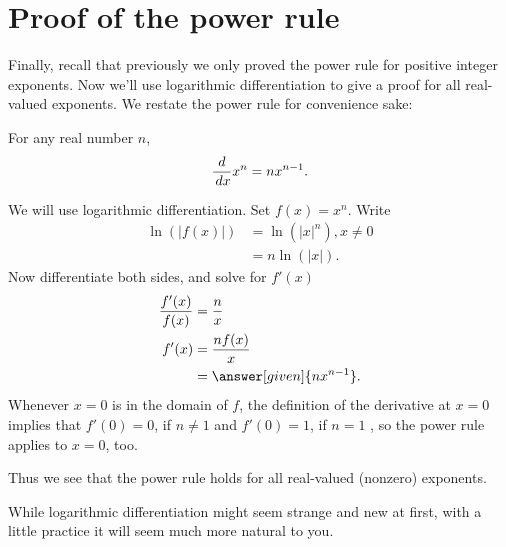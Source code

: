 \documentclass{ximera}
\begin{document}
\section{Proof of the power rule}


Finally, recall that previously we only proved the power rule for
positive integer exponents. Now we'll use logarithmic differentiation to give
a proof for all real-valued exponents. We restate the power rule
for convenience sake:

\begin{theorem}
	For any  real number $n$, 
	\[ \frac{d}{\,d x} x^n = n x^{n-1}. \]
	\begin{explanation}
	
		We will use logarithmic differentiation. Set $f(x) = x^n$. Write
		\begin{align*}
			\ln(|f(x)|) &= \ln\left(|x|^n\right) , x\ne0\\ 
				&= n\ln(|x|).
		\end{align*}
		Now differentiate both sides, and solve for $f'(x)$
		\begin{align*}
			\frac{f'(x)}{f(x)} &= \frac{n}{x}\\
				f'(x) &=\frac{n f(x)}{x}\\
				&= \answer[given]{n x^{n-1}}.
		\end{align*}
		Whenever $x=0$ is in the domain of $f$, the definition of the derivative at $x=0$ implies that  $f'(0)=0$, if $n\ne1$ and $f'(0)=1$, if $n=1$ , so the power rule applies to $x=0$, too.
		
		Thus we see that the power rule holds for all real-valued (nonzero) exponents.
	\end{explanation}
\end{theorem}

While logarithmic differentiation might seem strange and new at first, with a little practice it will seem much more natural to you.
\end{document}
